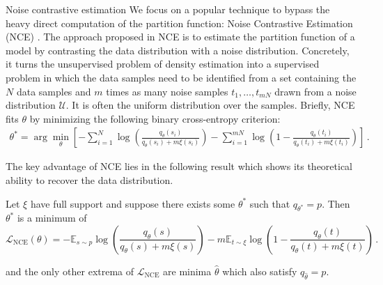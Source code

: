 \begin{mem1}{Noise contrastive estimation}\label{mem:NCE}
    We focus on a popular technique to bypass the heavy direct computation of the partition function: Noise Contrastive Estimation (NCE) \citep{gutmann2010noise}. The approach proposed in NCE is to estimate the partition function of a model by contrasting the data distribution with a noise distribution.
    Concretely, it turns the unsupervised problem of density estimation into a supervised problem in which the data samples need to be identified from a set containing the $N$ data samples and $m$ times as many noise samples $t_1, \dots, t_{mN}$ drawn from a noise distribution $\mathcal{U}$. It is often the uniform distribution over the samples. Briefly, NCE fits $\theta$ by minimizing the following binary cross-entropy criterion:
    \begin{align}
    \theta^* = \arg\min_{\theta} \left[ - \sum_{i=1}^{N} \log \left( \frac{q_{\theta}(s_i)}{q_{\theta}(s_i) + m\xi(s_i)} \right) - \sum_{i=1}^{mN} \log \left( 1 - \frac{q_{\theta}(t_i)}{q_{\theta}(t_i) + m\xi(t_i)} \right) \right] \, . \tag{2}
    \end{align}
    
    The key advantage of NCE lies in the following result which shows its theoretical ability to recover the data distribution.
    
    \begin{theorem}
    Let $\xi$ have full support and suppose there exists some $\theta^*$ such that $q_{\theta^*} = p$. Then $\theta^*$ is a minimum of
    \begin{equation}
    \mathcal{L}_{\text{NCE}}(\theta) = - \mathbb{E}_{s \sim p} \log \left( \frac{q_{\theta}(s)}{q_{\theta}(s) + m\xi(s)} \right) - m \mathbb{E}_{t \sim \xi} \log \left( 1 - \frac{q_{\theta}(t)}{q_{\theta}(t) + m\xi(t)} \right) \, . \tag{3}
    \end{equation}

    and the only other extrema of $\mathcal{L}_{\text{NCE}}$ are minima $\hat{\theta}$ which also satisfy $q_{\hat{\theta}} = p$.
    \end{theorem}

\end{mem1}


